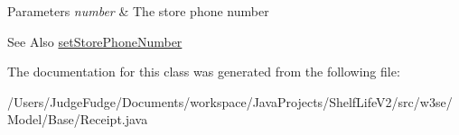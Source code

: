 \begin{DoxyParams}{Parameters}
{\em number} & The store phone number \\
\hline
\end{DoxyParams}
\begin{DoxySeeAlso}{See Also}
\hyperlink{classw3se_1_1_model_1_1_base_1_1_receipt_a5eac06c2c75a967c5f9e8eda15d3cb2e}{set\-Store\-Phone\-Number} 
\end{DoxySeeAlso}


The documentation for this class was generated from the following file\-:\begin{DoxyCompactItemize}
\item 
/\-Users/\-Judge\-Fudge/\-Documents/workspace/\-Java\-Projects/\-Shelf\-Life\-V2/src/w3se/\-Model/\-Base/Receipt.\-java\end{DoxyCompactItemize}
